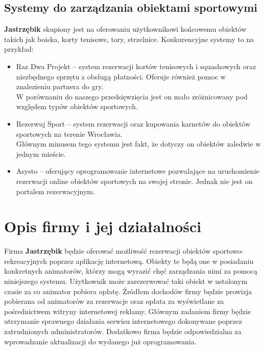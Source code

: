 \documentclass[a4paper,11pt]{article}
\begin{document}
    \subsection{Systemy do zarządzania obiektami sportowymi}
    
        \textbf{Jastrzębik} skupiony jest na oferowaniu użytkownikowi końcowemu obiektów takich jak boiska, korty tenisowe, tory, strzelnice.
        Konkurencyjne systemy to na przykład:
    
        \begin{itemize}
            \item Raz Dwa Projekt -- system rezerwacji kortów tenisowych i squashowych oraz niezbędnego sprzętu z obsługą płatności. Oferuje również pomoc w znalezieniu partnera do gry.
            \\ W porównaniu do naszego przedsięwzięcia jest on mało zróżnicowany pod względem typów obiektów sportowych.
            \item Rezerwuj Sport -- system rezerwacji oraz kupowania karnetów do obiektów sportowych na terenie Wrocławia.
            \\ Głównym minusem tego systemu jest fakt, że dotyczy on obiektów zaledwie w jednym mieście.
            \item Asysto -- oferujący oprogramowanie internetowe pozwalające na uruchomienie rezerwacji online obiektów sportowych na swojej stronie. Jednak nie jest on portalem rezerwacyjnym.
        \end{itemize}
    
\section{Opis firmy i jej działalności}

    Firma \textbf{Jastrzębik} będzie oferować możliwość rezerwacji obiektów sportowo-rekreacyjnych poprzez aplikację internetową. Obiekty te będą one w posiadaniu konkretnych animatorów, którzy mogą wyrazić chęć zarządzania nimi za pomocą niniejszego systemu.
    Użytkownik może zarezerwować taki obiekt w ustalonym czasie za co animator pobiera opłatę.
    Źródłem dochodów firmy będzie prowizja pobierana od animatorów za rezerwacje oraz opłata za wyświetlane za pośrednictwem witryny internetowej reklamy.
    Głównym zadaniem firmy będzie utrzymanie sprawnego działania serwisu internetowego dokonywane poprzez zatrudnionych administratorów. Dodatkowo firma będzie odpowiedzialna za wprowadzanie aktualizacji do wydanego już oprogramowania.
\end{document}
